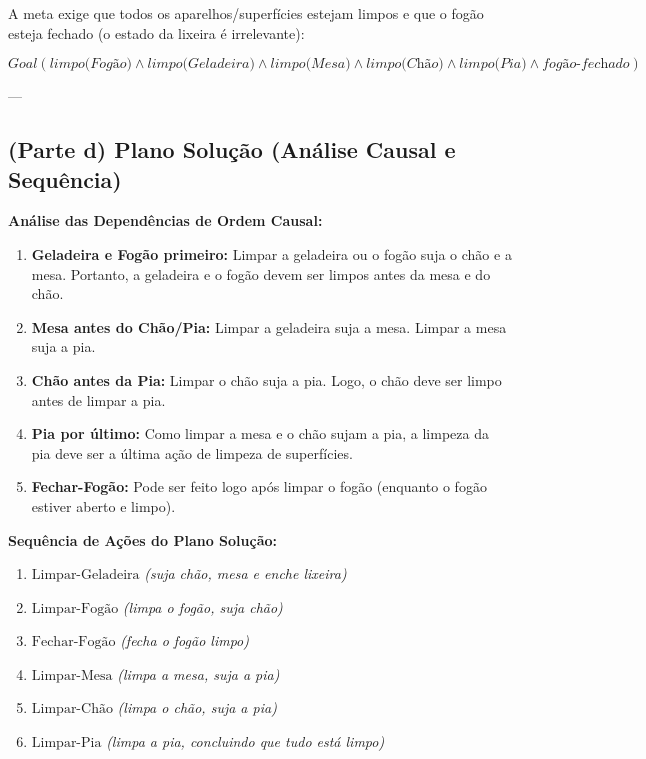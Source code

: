 \documentclass[a4paper,12pt]{article}
\begin{document}
A meta exige que todos os aparelhos/superfícies estejam limpos e que o fogão esteja fechado (o estado da lixeira é irrelevante):

\begin{equation}
	Goal(\textit{limpo(Fogão)} \wedge \textit{limpo(Geladeira)} \wedge \textit{limpo(Mesa)} \wedge \textit{limpo(Chão)} \wedge \textit{limpo(Pia)} \wedge \textit{fogão-fechado})
\end{equation}

---

\subsection*{(Parte d) Plano Solução (Análise Causal e Sequência)}

\textbf{Análise das Dependências de Ordem Causal:}
\begin{enumerate}
	\item \textbf{Geladeira e Fogão primeiro:} Limpar a geladeira ou o fogão suja o chão e a mesa. Portanto, a geladeira e o fogão devem ser limpos antes da mesa e do chão.
	\item \textbf{Mesa antes do Chão/Pia:} Limpar a geladeira suja a mesa. Limpar a mesa suja a pia.
	\item \textbf{Chão antes da Pia:} Limpar o chão suja a pia. Logo, o chão deve ser limpo antes de limpar a pia.
	\item \textbf{Pia por último:} Como limpar a mesa e o chão sujam a pia, a limpeza da pia deve ser a última ação de limpeza de superfícies.
	\item \textbf{Fechar-Fogão:} Pode ser feito logo após limpar o fogão (enquanto o fogão estiver aberto e limpo).
\end{enumerate}

\textbf{Sequência de Ações do Plano Solução:}
\begin{enumerate}
	\item $\text{Limpar-Geladeira}$ \textit{(suja chão, mesa e enche lixeira)}
	\item $\text{Limpar-Fogão}$ \textit{(limpa o fogão, suja chão)}
	\item $\text{Fechar-Fogão}$ \textit{(fecha o fogão limpo)}
	\item $\text{Limpar-Mesa}$ \textit{(limpa a mesa, suja a pia)}
	\item $\text{Limpar-Chão}$ \textit{(limpa o chão, suja a pia)}
	\item $\text{Limpar-Pia}$ \textit{(limpa a pia, concluindo que tudo está limpo)}
\end{enumerate}
\end{document}
